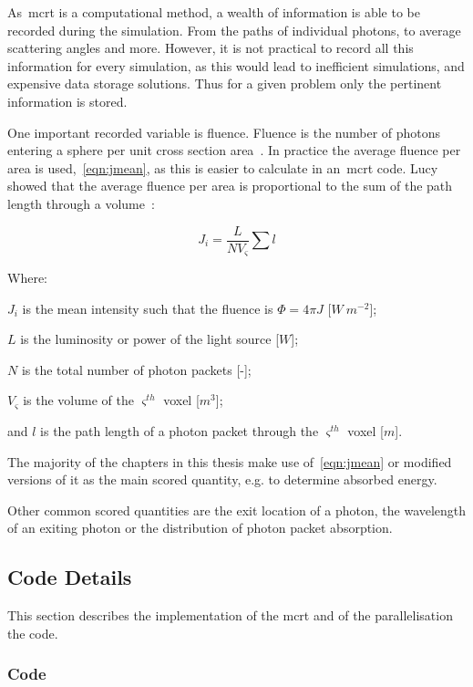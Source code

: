As~\gls*{mcrt} is a computational method, a wealth of information is able to be recorded during the simulation.
From the paths of individual photons, to average scattering angles and more.
However, it is not practical to record all this information for every simulation, as this would lead to inefficient simulations, and expensive data storage solutions.
Thus for a given problem only the pertinent information is stored.

One important recorded variable is fluence.
Fluence is the number of photons entering a sphere per unit cross section area~\cite{rogers1990monte}.
In practice the average fluence per area is used,~\cref{eqn:jmean}, as this is easier to calculate in an~\gls*{mcrt} code.
Lucy showed that the average fluence per area is proportional to the sum of the path length through a volume~\cite{lucy1999computing}:

\begin{equation}
J_i = \frac{L}{NV_{\varsigma}}\sum l 
\label{eqn:jmean}
\end{equation}

\noindent Where:

\indent $J_i$ is the mean intensity such that the fluence is $\Phi=4\pi J$ [$W\ m^{-2}$];

\indent $L$ is the luminosity or power of the light source [$W$];

\indent $N$ is the total number of photon packets [-];

\indent $V_{\varsigma}$ is the volume of the $\varsigma^{th}$ voxel [$m^3$];

\indent and $l$ is the path length of a photon packet through the $\varsigma^{th}$ voxel [$m$]. 

\medskip

The majority of the chapters in this thesis make use of~\cref{eqn:jmean} or modified versions of it as the main scored quantity, e.g. to determine absorbed energy.

Other common scored quantities are the exit location of a photon, the wavelength of an exiting photon or the distribution of photon packet absorption.

\subsection{Code Details}

This section describes the implementation of the \gls*{mcrt} and of the parallelisation the code.

\subsubsection*{Code}

